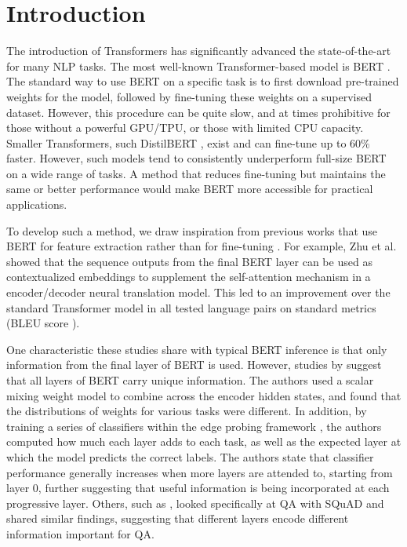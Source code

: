 \section{Introduction}



The introduction of Transformers \cite{Vaswani2017} has significantly advanced the state-of-the-art for many NLP tasks. The most well-known Transformer-based model is BERT \cite{Devlin2019}. The standard way to use BERT on a specific task is to first download pre-trained weights for the model, followed by fine-tuning these weights on a supervised dataset. However, this procedure can be quite slow, and at times prohibitive for those without a powerful GPU/TPU, or those with limited CPU capacity. Smaller Transformers, such DistilBERT \cite{sanh2019distilbert}, exist and can fine-tune up to 60\% faster. However, such models tend to consistently underperform full-size BERT on a wide range of tasks. A method that reduces fine-tuning but maintains the same or better performance would make BERT more accessible for practical applications.

To develop such a method, we draw inspiration from previous works that use BERT for feature extraction rather than for fine-tuning \citep{Zhu2020IncorporatingBI, Chen_2020}. For example, Zhu et al. showed that the sequence outputs from the final BERT layer can be used as contextualized embeddings to supplement the self-attention mechanism in a encoder/decoder neural translation model. This led to an improvement over the standard Transformer model in all tested language pairs on standard metrics (BLEU score \cite{Papineni02bleu:a}).

One characteristic these studies share with typical BERT inference is that only information from the final layer of BERT is used. However, studies by \cite{Tenney2020} suggest that all layers of BERT carry unique information. The authors used a scalar mixing weight model to combine across the encoder hidden states, and found that the distributions of weights for various tasks were different. In addition, by training a series of classifiers within the edge probing framework \cite{DBLP:journals/corr/abs-1905-06316}, the authors computed how much each layer adds to each task, as well as the expected layer at which the model predicts the correct labels. The authors state that classifier performance generally increases when more layers are attended to, starting from layer 0, further suggesting that useful information is being incorporated at each progressive layer. Others, such as \cite{Aken2020}, looked specifically at QA with SQuAD and shared similar findings, suggesting that different layers encode different information important for QA.


